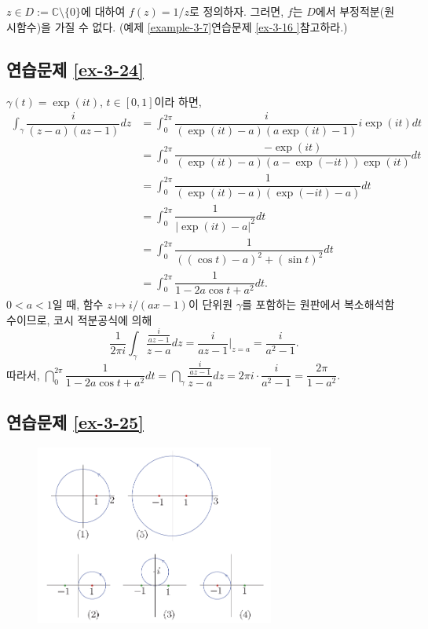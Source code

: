 $z\in D:= \mathbb C\setminus\{0\}$에 대하여 $f(z) = 1/z$로 정의하자.
그러면, $f$는 $D$에서 부정적분(원시함수)을 가질 수 없다.
(예제 \ref{example-3-7}\과 연습문제 \ref{ex-3-16 }\을 참고하라.)

\subsection*{연습문제 \ref{ex-3-24}}

$\gamma(t) = \exp(it)$, $t\in[0,1]$이라 하면,
\begin{align*}
\int_\gamma \dfrac i{(z-a)(az-1)}dz 
&= \int_0^{2\pi} \dfrac{i}{(\exp(it) -a)(a\exp(it)-1)}i\exp(it)dt \\
&= \int_0^{2\pi} \dfrac{-\exp(it)}{(\exp(it) -a)(a-\exp(-it))\exp(it)}dt \\
&= \int_0^{2\pi} \dfrac{1}{(\exp(it) -a)(\exp(-it)-a)}dt \\
&= \int_0^{2\pi} \dfrac1{|\exp(it)-a|^2}dt \\
&= \int_0^{2\pi} \dfrac1{((\cos t)-a)^2 + (\sin t)^2}dt \\
&= \int_0^{2\pi} \dfrac1{1-2a\cos t + a^2}dt.
\end{align*}
$0<a<1$일 때,
함수 $z\mapsto i/(ax-1)$이 단위원 $\gamma$를 포함하는 원판에서 복소해석함수이므로,
코시 적분공식에 의해
\[
\dfrac1{2\pi i} \int_\gamma \dfrac{\frac{i}{az-1}}{z-a}dz = \dfrac{i}{az-1}\Big|_{z=a}
= \dfrac i{a^2-1}.
\]
따라서,
$\dint_0^{2\pi} \dfrac 1{1-2a\cos t +a^2}dt
= \dint_\gamma \dfrac{\frac{i}{az-1}}{z-a}dz 
= 2\pi i \cdot \dfrac i{a^2-1} = \dfrac{2\pi}{1-a^2}$.

\subsection*{연습문제 \ref{ex-3-25}}

\begin{figure}[h!]
\begin{center}
\includegraphics[width=0.7\textwidth]{./figs/fig-s-0-11}
\end{center}
\end{figure}

